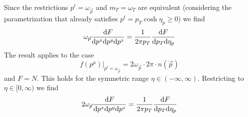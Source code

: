 Since the restrictions $p^t=\omega_{\vec{p}}$ and $m_T=\omega_T$ are equivalent (considering the parametrization that already satisfies $p^t=p_T\cosh\eta_p\geq 0$) we find
\begin{equation}
    \omega_{\vec{p}}\frac{\text{d} F}{\text{d} p^x\text{d} p^y\text{d} p^z}=\frac{1}{2\pi p_T}\frac{\text{d} F}{\text{d} p_T\text{d}\eta_p}
\end{equation}
The result applies to the case
\begin{equation}
    f(p^\mu)\big\vert_{p^t=\omega_{\vec{p}}}=2\omega_{\vec{p}}\cdot 2\pi\cdot n(\vec{p})
\end{equation}
and $F=N$. This holds for the symmetric range $\eta\in(-\infty,\infty)$. Restricting to $\eta\in[0,\infty)$ we find
\begin{equation}
    2\omega_{\vec{p}}\frac{\text{d} F}{\text{d} p^x\text{d} p^y\text{d} p^z}=\frac{1}{2\pi p_T}\frac{\text{d} F}{\text{d} p_T\text{d}\eta_p}
\end{equation}